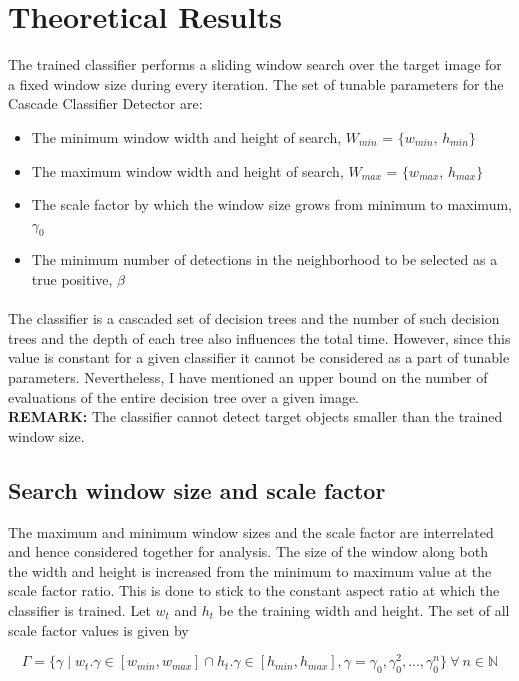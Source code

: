 \section{Theoretical Results}
The trained classifier performs a sliding window search over the target image for a fixed window size during every iteration. The set of tunable parameters for the Cascade Classifier Detector are:

\begin{itemize}
    \item The minimum window width and height of search, $W_{min}$ = $\{ w_{min}$, $h_{min} \}$
    \item The maximum window width and height of search, $W_{max}$ = $\{ w_{max}$, $h_{max} \}$
    \item The scale factor by which the window size grows from minimum to maximum, $\gamma_0$
    \item The minimum number of detections in the neighborhood to be selected as a true positive, $\beta$
\end{itemize}

\paragraph{}
The classifier is a cascaded set of decision trees and the number of such decision trees and the depth of each tree also influences the total time. However, since this value is constant for a given classifier it cannot be considered as a part of tunable parameters. Nevertheless, I have mentioned an upper bound on the number of evaluations of the entire decision tree over a given image. \\
\textbf{REMARK:} The classifier cannot detect target objects smaller than the trained window size. 

\subsection{Search window size and scale factor}
The maximum and minimum window sizes and the scale factor are interrelated and hence considered together for analysis. The size of the window along both the width and height is increased from the minimum to maximum value at the scale factor ratio. This is done to stick to the constant aspect ratio at which the classifier is trained. Let $w_t$ and $h_t$ be the training width and height. The set of all scale factor values is given by

\begin{equation}
\Gamma = \{ \gamma \mid w_t.\gamma \in [w_{min}, w_{max}] \cap h_t.\gamma \in [h_{min}, h_{max}], \gamma = \gamma_0, \gamma_0^2, ... ,\gamma_0^n\} \  \forall \ n \in \mathbb{N}     
\label{eq1}
\end{equation} 

